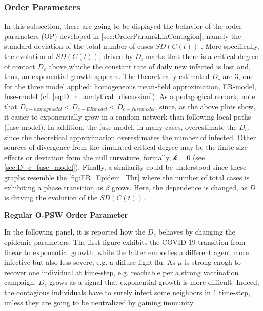 \documentclass[a4paper,10pt,twoside]{book} %
\theoremstyle{definition}
\begin{document}
\newpage
\subsubsection*{Order Parameters}
In this subsection, there are going to be displayed the behavior of the order parameters (OP) developed in \autoref{sec:OrderParam4LinContagion}, namely the standard deviation of the total number of cases $SD(C(t))$ . More specifically, the evolution of $SD(C(t))$, driven by $D$, marks that there is a critical degree of contact $D_c$ above whiche the constant rate of daily new infected is lost and, thus, an exponential growth appears. The theoretically estimated $D_c$ are 3, one for the three model applied: homogeneous mean-field approximation, ER-model, fuse-model (cf. \autoref{eq:D_c_analytical_discussion}).
As a pedagogical remark, note that $D_{c-homog model} < D_{c-ER model} < D_{c-fuse model}$, since, as the above plots show, it easier to exponentially grow in a random network than following local paths (fuse model). In addition, the fuse model, in many cases, overestimate the $D_c$, since the theoretical approximation overestimates the number of infected. Other sources of divergence from the simulated critical degree may be the finite size effects or deviation from the null curvature, formally, $\mathcal{k} = 0$ (see \autoref{sec:D_c_fuse_model}).
Finally, a similarity could be understood since these graphs resemble the \autoref{fig:ER_Epidem_Thr} where the number of total cases is exhibiting a phase transition as $\beta$ grows. Here, the dependence is changed, as $D$ is driving the evolution of the $SD(C(t))$.

\textbf{Regular O-PSW Order Parameter}

In the following panel, it is reported how the $D_c$ behaves by changing the epidemic parameters. The first figure exhibits the COVID-19 transition from linear to exponential growth; while the latter embodies a different agent more infective but also less severe, e.g. a diffuse light flu. As $ \mu$ is strong enogh to recover one individual at time-step, e.g. reachable per a strong vaccination campaign, $D_c$ grows as a signal that exponential growth is more difficult. Indeed, the contagious individuals have to surely infect some neighbors in $1$ time-step, unless they are going to be neutralized by gaining immunity.  
\end{document}
